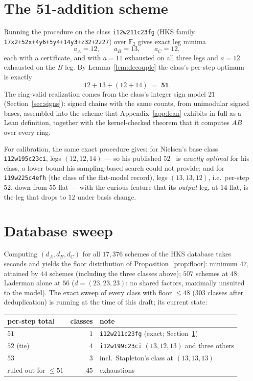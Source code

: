\documentclass[11pt]{article}
\theoremstyle{definition}
\theoremstyle{remark}
\newcommand{\F}{\mathbb{F}}
\begin{document}
\section{The 51-addition scheme}\label{sec:result}

Running the procedure on the class \texttt{i12w211c23fg} (HKS family
\texttt{17x2+52x+4y6+5y4+14y3+z32+2z27}) over $\F_2$ gives exact leg
minima
\[
a_A = 12,\qquad a_B = 13,\qquad a_C = 12,
\]
each with a certificate, and with $a{=}11$ exhausted on all three legs
and $a{=}12$ exhausted on the $B$ leg.  By
Lemma~\ref{lem:decouple} the class's per-step optimum is exactly
\[
12+13+(12+14) \;=\; \mathbf{51}.
\]
The ring-valid realization comes from the class's integer sign model
$21$ (Section~\ref{sec:signs}): signed chains with the same counts,
from unimodular signed bases, assembled into the scheme that
Appendix~\ref{app:lean} exhibits in full as a Lean definition,
together with the kernel-checked theorem that it computes $AB$ over
every ring.

For calibration, the same exact procedure gives: for Nielsen's base
class \texttt{i12w195c23ci}, legs $(12,12,14)$ --- so his published
$52$~\cite{Nielsen26} is \emph{exactly optimal} for his class, a lower
bound his sampling-based search could not provide; and for
\texttt{i19w225c4efh} (the class of the flat-model record), legs
$(13,13,12)$, i.e.\ per-step $52$, down from $55$ flat --- with the
curious feature that its \emph{output} leg, at $14$ flat, is the leg
that drops to $12$ under basis change.

\section{Database sweep}\label{sec:sweep}

Computing $(d_A,d_B,d_C)$ for all $17{,}376$ schemes of the HKS
database takes seconds and yields the floor distribution of
Proposition~\ref{prop:floor}: minimum $47$, attained by $44$ schemes
(including the three classes above); $507$ schemes at $48$; Laderman
alone at $56$ ($d=(23,23,23)$: no shared factors, maximally unsuited
to the model).  The exact sweep of every class with floor $\le48$
($303$ classes after deduplication) is running at the time of this
draft; its current state:

\begin{center}
\begin{tabular}{lrl}
\toprule
per-step total & classes & note\\
\midrule
$51$ & $1$ & \texttt{i12w211c23fg} (exact; Section~\ref{sec:result})\\
$52$ (tie) & $4$ & \texttt{i12w199c23ci} $(13,12,13)$ and three others\\
$53$ & $3$ & incl.\ Stapleton's class at $(13,13,13)$\\
ruled out for $\le51$ & $45$ & exhaustions\\
\bottomrule
\end{tabular}
\end{center}
\end{document}

